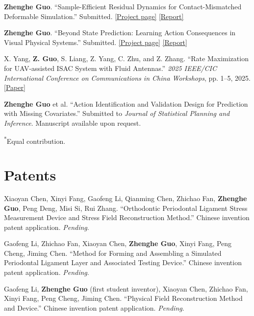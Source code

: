 \documentclass[10pt,letterpaper]{article}
\newcommand{\link}[2]{\href{#1}{\textcolor{accent}{\underline{#2}}}}
\begin{document}
\vspace{3pt}
\textbf{Zhenghe Guo}. ``Sample-Efficient Residual Dynamics for Contact-Mismatched Deformable Simulation.'' Submitted. \link{https://styokuok.github.io/res_dyn/}{[Project page]} \link{https://styokuok.github.io/res_dyn/report/\#page=1}{[Report]}

\vspace{3pt}
\textbf{Zhenghe Guo}. ``Beyond State Prediction: Learning Action Consequences in Visual Physical Systems.'' Submitted. \link{https://styokuok.github.io/vis_phys/}{[Project page]} \link{https://styokuok.github.io/vis_phys/report/\#page=1}{[Report]}

\vspace{3pt}
X. Yang, \textbf{Z. Guo}, S. Liang, Z. Yang, C. Zhu, and Z. Zhang. ``Rate Maximization for UAV-assisted ISAC System with Fluid Antennas.'' \textit{2025 IEEE/CIC International Conference on Communications in China Workshops}, pp. 1--5, 2025. \link{https://doi.org/10.1109/ICCCWorkshops67136.2025.11148178}{[Paper]}

\vspace{3pt}
\textbf{Zhenghe Guo} et al. ``Action Identification and Validation Design for Prediction with Missing Covariates.'' Submitted to \textit{Journal of Statistical Planning and Inference}. Manuscript available upon request.

\vspace{3pt}
{\footnotesize \textsuperscript{*}Equal contribution.}

\newpage
\section{Patents}
Xiaoyan Chen, Xinyi Fang, Gaofeng Li, Qianming Chen, Zhichao Fan, \textbf{Zhenghe Guo}, Peng Deng, Misi Si, Rui Zhang. ``Orthodontic Periodontal Ligament Stress Measurement Device and Stress Field Reconstruction Method.'' Chinese invention patent application. \textit{Pending}.

\vspace{4pt}
Gaofeng Li, Zhichao Fan, Xiaoyan Chen, \textbf{Zhenghe Guo}, Xinyi Fang, Peng Cheng, Jiming Chen. ``Method for Forming and Assembling a Simulated Periodontal Ligament Layer and Associated Testing Device.'' Chinese invention patent application. \textit{Pending}.

\vspace{4pt}
Gaofeng Li, \textbf{Zhenghe Guo} (first student inventor), Xiaoyan Chen, Zhichao Fan, Xinyi Fang, Peng Cheng, Jiming Chen. ``Physical Field Reconstruction Method and Device.'' Chinese invention patent application. \textit{Pending}.
\end{document}
